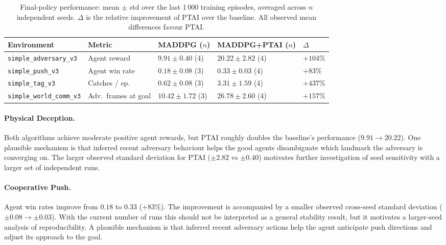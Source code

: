 \documentclass[12pt]{article}
\begin{document}
\begin{table}[H]
\centering
\caption{Final-policy performance: mean $\pm$ std over the last 1\,000 training episodes,
averaged across $n$ independent seeds. $\Delta$ is the relative improvement of PTAI over
the baseline. All observed mean differences favour PTAI.}
\label{tab:results}
\begin{tabular}{lllll}
\toprule
Environment & Metric & MADDPG ($n$) & MADDPG+PTAI ($n$) & $\Delta$ \\
\midrule
\texttt{simple\_adversary\_v3}
  & Agent reward
  & $9.91 \pm 0.40$ (4)
  & $20.22 \pm 2.82$ (4)
  & $+104\%$ \\
\texttt{simple\_push\_v3}
  & Agent win rate
  & $0.18 \pm 0.08$ (3)
  & $0.33 \pm 0.03$ (4)
  & $+83\%$ \\
\texttt{simple\_tag\_v3}
  & Catches / ep.
  & $0.62 \pm 0.08$ (3)
  & $3.31 \pm 1.59$ (4)
  & $+437\%$ \\
\texttt{simple\_world\_comm\_v3}
  & Adv.\ frames at goal
  & $10.42 \pm 1.72$ (3)
  & $26.78 \pm 2.60$ (4)
  & $+157\%$ \\
\bottomrule
\end{tabular}
\end{table}

\paragraph{Physical Deception.}
Both algorithms achieve moderate positive agent rewards, but PTAI roughly doubles the
baseline's performance ($9.91 \to 20.22$). One plausible mechanism is that inferred recent adversary behaviour helps the good agents
disambiguate which landmark the adversary is converging on. The larger observed standard deviation for PTAI ($\pm 2.82$ vs $\pm 0.40$) motivates
further investigation of seed sensitivity with a larger set of independent runs.

\paragraph{Cooperative Push.}
Agent win rates improve from $0.18$ to $0.33$ ($+83\%$). The improvement is accompanied by a smaller observed cross-seed standard deviation
($\pm 0.08 \to \pm 0.03$). With the current number of runs this should not be interpreted
as a general stability result, but it motivates a larger-seed analysis of reproducibility.
A plausible mechanism is that inferred recent adversary actions help the agent anticipate
push directions and adjust its approach to the goal.
\end{document}
